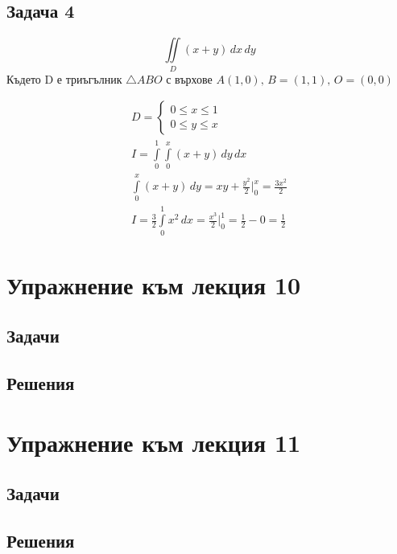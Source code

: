 \documentclass[a4paper,fleqn,12pt]{article}
\theoremstyle{definition}
\begin{document}
\subsection*{Задача 4}
$$\iint\limits_D (x+y) \, dx \, dy$$
Където D е триъгълник $\triangle ABO$ с върхове $A(1,0),\, B = (1,1),\, O = (0,0)$

\begin{gather*}
D = \begin{cases} 0 \leq x \leq 1 \\ 0\leq y \leq x \end{cases} \\
I = \int\limits_0 ^1 \int\limits_{0} ^{x} (x+y)\, dy \,dx\\
\int\limits_{0} ^{x} (x+y)\, dy = xy + \frac{y^2}{2} \Big|_{0} ^{x} = \frac{3x^2}{2} \\
I = \frac{3}{2}  \int\limits_0 ^1 x^2 \,dx = \frac{x^3}{2}\Big|_0 ^1 = \frac{1}{2} - 0 = \frac{1}{2}
\end{gather*}

\newpage 
\section{Упражнение към лекция 10}

\subsection{Задачи}

\newpage
\subsection{Решения}

\newpage 
\section{Упражнение към лекция 11}

\subsection{Задачи}

\newpage
\subsection{Решения}
\end{document}
